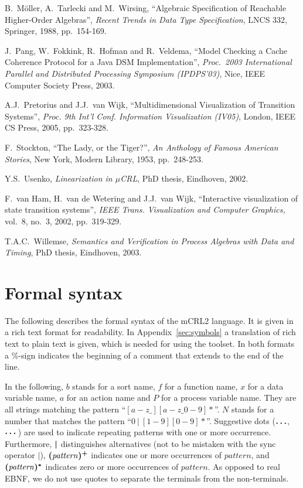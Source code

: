 \documentclass[a4paper,fleqn]{article}
\newcommand{\frm}[1]{\mbox{\ensuremath{#1}}}
\newcommand{\f}[1]{\ensuremath{\mathit{#1}}}
\newcommand{\mb}[1]{\text{\boldmath$#1$}}%
\newcommand{\mCRL}{\frm{\mu}CRL\xspace}
\begin{document}
\begin{thebibliography}{99}
B.\ M\"{o}ller, A.\ Tarlecki and M.\ Wirsing,
``Algebraic Specification of Reachable Higher-Order Algebras'',
\emph{Recent Trends in Data Type Specification},
LNCS 332, Springer, 1988, pp.\ 154-169.

J.\ Pang, W.\ Fokkink, R.\ Hofman and R.\ Veldema, ``Model
Checking a Cache Coherence Protocol for a Java DSM
Implementation'', \emph{Proc.\ 2003 International Parallel and
Distributed Processing Symposium (IPDPS'03)}, Nice, IEEE Computer
Society Press, 2003.

A.J.\ Pretorius and J.J.\ van Wijk,
``Multidimensional Visualization of Transition Systems'',
\emph{Proc. 9th Int'l Conf. Information Visualization (IV05)},
London, IEEE CS Press, 2005, pp.\ 323-328.

F.\ Stockton,
``The Lady, or the Tiger?'',
\emph{An Anthology of Famous American Stories},
New York, Modern Library, 1953, pp.\ 248-253.

Y.S.\ Usenko,
\emph{Linearization in \mCRL},
PhD thesis, Eindhoven, 2002.

F.\ van Ham, H.\ van de Wetering and J.J.\ van Wijk,
``Interactive visualization of state transition systems'',
\emph{IEEE Trans. Visualization and Computer Graphics,}
vol.\ 8, no.\ 3, 2002, pp.\ 319-329.

T.A.C.\ Willemse,
\emph{Semantics and Verification in Process Algebras with Data and Timing},
PhD thesis, Eindhoven, 2003.

\end{thebibliography}

\appendix

\section{Formal syntax}
\label{sec:syntax}

The following describes the formal syntax of the mCRL2 language. It is given
in a rich text format for readability. In Appendix~\ref{sec:symbols} a
translation of rich text to plain text is given, which is needed for
using the toolset. In both formats a $\%$-sign indicates the beginning of a
comment that extends to the end of the line.

In the following, $b$ stands for a sort name, $f$ for a function name, $x$ for
a data variable name, $a$ for an action name and $P$ for a process variable
name. They are all strings matching the pattern ``$[a{-}z\_][a{-}z\_0{-}9]*$''.
$N$ stands for a number that matches the pattern ``$0\ |\ [1-9][0-9]*$''.
Suggestive dots ($\mb{\ldots}$, $\mb{\cdots}$) are used to indicate repeating patterns with one or
more occurrence. Furthermore, $\mb{|}$ distinguishes alternatives (not to be mistaken
with the sync operator $|$), $\mb{(}\f{pattern}\mb{)^{+}}$ indicates one or more
occurrences of $\f{pattern}$, and $\mb{(}\f{pattern}\mb{)^{*}}$ indicates zero or more
occurrences of $\f{pattern}$. As opposed to real EBNF, we do not use quotes to
separate the terminals from the non-terminals.
\end{document}

